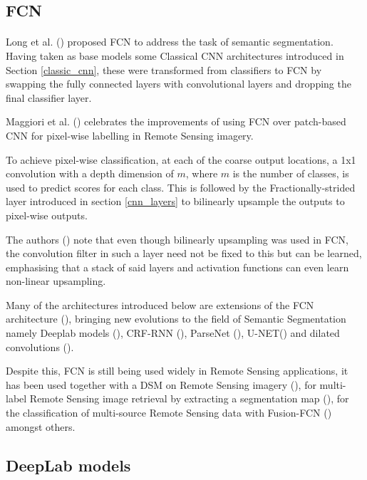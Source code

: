 \subsection{\gls{FCN}} 
\paragraph{}
Long et al. (\cite{long2015fully}) proposed \gls{FCN} to address the task of semantic segmentation. Having taken as base models some Classical \gls{CNN} architectures introduced in Section \ref{classic_cnn}, these were transformed from classifiers to \gls{FCN} by swapping the fully connected layers with convolutional layers and dropping the final classifier layer. 

Maggiori et al. (\cite{7730322}) celebrates the improvements of using \gls{FCN} over patch-based \gls{CNN} for pixel-wise labelling in Remote Sensing imagery.

To achieve pixel-wise classification, at each of the coarse output locations, a 1x1 convolution with a depth dimension of $m$, where $m$ is the number of classes, is used to predict scores for each class. This is followed by the Fractionally-strided layer introduced in section \ref{cnn_layers} to bilinearly upsample the outputs to pixel-wise outputs. 

The authors (\cite{long2015fully}) note that even though bilinearly upsampling was used in \gls{FCN}, the convolution filter in such a layer need not be fixed to this but can be learned, emphasising that a stack of said layers and activation functions can even learn non-linear upsampling.

Many of the architectures introduced below are extensions of the \gls{FCN} architecture (\cite{long2015fully}), bringing new evolutions to the field of Semantic Segmentation namely Deeplab models (\cite{chen2017deeplab}), \gls{CRF}-\gls{RNN} (\cite{Zheng_2015}), ParseNet (\cite{liu2015parsenet}), U-NET(\cite{ronneberger2015unet}) and dilated convolutions (\cite{yu2016multiscale}).

Despite this, \gls{FCN} is still being used widely in Remote Sensing applications, it has been used together with a \gls{DSM} on Remote Sensing imagery (\cite{8281008}), for multi-label Remote Sensing image retrieval by extracting a segmentation map (\cite{8954885}), for the classification of multi-source Remote Sensing data with Fusion-\gls{FCN} (\cite{8518295}) amongst others.

\subsection{DeepLab models}

